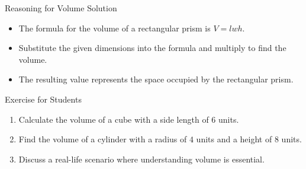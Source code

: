 \begin{frame}{Reasoning for Volume Solution}
  \begin{itemize}
    \item The formula for the volume of a rectangular prism is $V = lwh$.
    \item Substitute the given dimensions into the formula and multiply to find the volume.
    \item The resulting value represents the space occupied by the rectangular prism.
  \end{itemize}
\end{frame}

\begin{frame}{Exercise for Students}
  \begin{enumerate}
    \item Calculate the volume of a cube with a side length of $6$ units.
    \item Find the volume of a cylinder with a radius of $4$ units and a height of $8$ units.
    \item Discuss a real-life scenario where understanding volume is essential.
  \end{enumerate}
\end{frame}

